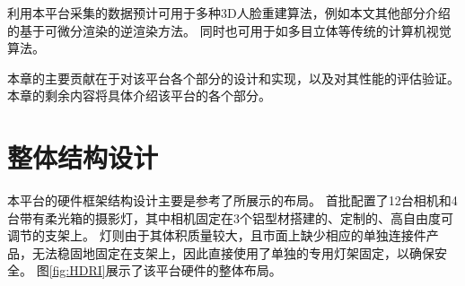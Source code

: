 利用本平台采集的数据预计可用于多种3D人脸重建算法，例如本文其他部分介绍的基于可微分渲染的逆渲染方法。
同时也可用于如多目立体等传统的计算机视觉算法。

本章的主要贡献在于对该平台各个部分的设计和实现，以及对其性能的评估验证。
本章的剩余内容将具体介绍该平台的各个部分。

\section{整体结构设计}

本平台的硬件框架结构设计主要是参考了\citet{RiviereGBGB20}所展示的布局。
首批配置了12台相机和4台带有柔光箱的摄影灯，其中相机固定在3个铝型材搭建的、定制的、高自由度可调节的支架上。
灯则由于其体积质量较大，且市面上缺少相应的单独连接件产品，无法稳固地固定在支架上，因此直接使用了单独的专用灯架固定，以确保安全。
图\ref{fig:HDRI}展示了该平台硬件的整体布局。

